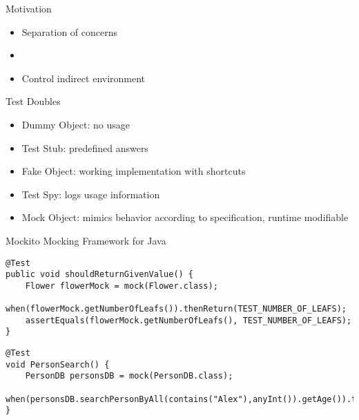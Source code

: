 \begin{frame}[fragile]{\insertsubsection}
	\begin{fancycolumns}[animation=none]
		\begin{note}{Motivation}
			\begin{itemize}
				\item Separation of concerns
				\item {}
				\item Control indirect environment
			\end{itemize}
		\end{note}\pause
		\begin{definition}{Test Doubles}
			\begin{itemize}
				\item Dummy Object: no usage
				\item Test Stub: predefined answers
				\item Fake Object: working implementation with shortcuts
				\item Test Spy: logs usage information
				\item Mock Object: mimics behavior according to specification, runtime modifiable
			\end{itemize}
		\end{definition}\pause
		\nextcolumn
		\begin{note}{Mockito}
			Mocking Framework for Java
		\end{note}
		\begin{verbatim}
@Test
public void shouldReturnGivenValue() {
	Flower flowerMock = mock(Flower.class); 
	when(flowerMock.getNumberOfLeafs()).thenReturn(TEST_NUMBER_OF_LEAFS);
	assertEquals(flowerMock.getNumberOfLeafs(), TEST_NUMBER_OF_LEAFS);
}
		\end{verbatim} \vspace{-2mm}
		\begin{verbatim}
@Test
void PersonSearch() {
	PersonDB personsDB = mock(PersonDB.class);
	when(personsDB.searchPersonByAll(contains("Alex"),anyInt()).getAge()).thenReturn(43);
}
		\end{verbatim}
	\end{fancycolumns}
\end{frame}

